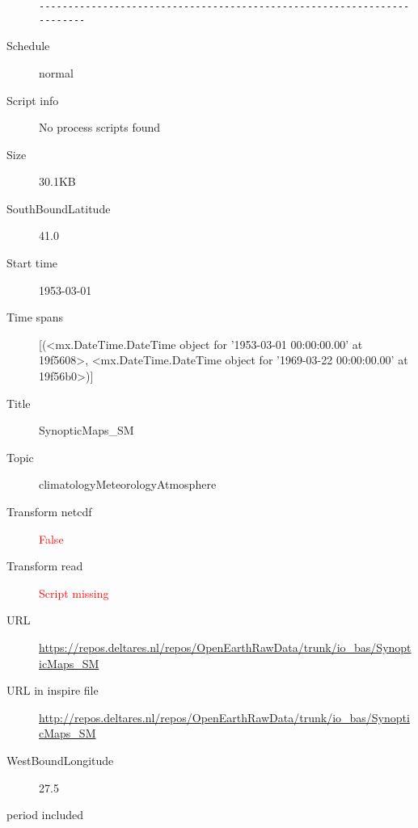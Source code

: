 \documentclass[9]{report}
\begin{document}
\begin{description}
\begin{verbatim}
------------------------------------------------------------------------

\end{verbatim}
  \item[Schedule] normal
  \item[Script info] No process scripts found
  \item[Size] 30.1KB
  \item[SouthBoundLatitude] 41.0
  \item[Start time] 1953-03-01
  \item[Time spans] [(<mx.DateTime.DateTime object for '1953-03-01 00:00:00.00' at 19f5608>, <mx.DateTime.DateTime object for '1969-03-22 00:00:00.00' at 19f56b0>)]
  \item[Title]  SynopticMaps\_SM 
  \item[Topic] climatologyMeteorologyAtmosphere
  \item[Transform netcdf] \textcolor{red}{False}
  \item[Transform read] \textcolor{red}{Script missing}
  \item[URL] \href{https://repos.deltares.nl/repos/OpenEarthRawData/trunk/io\_bas/SynopticMaps\_SM}{https://repos.deltares.nl/repos/OpenEarthRawData/trunk/io\_bas/SynopticMaps\_SM}
  \item[URL in inspire file] \href{http://repos.deltares.nl/repos/OpenEarthRawData/trunk/io\_bas/SynopticMaps\_SM}{http://repos.deltares.nl/repos/OpenEarthRawData/trunk/io\_bas/SynopticMaps\_SM}
  \item[WestBoundLongitude] 27.5
  \item[period included] 
\end{description}
\end{document}
